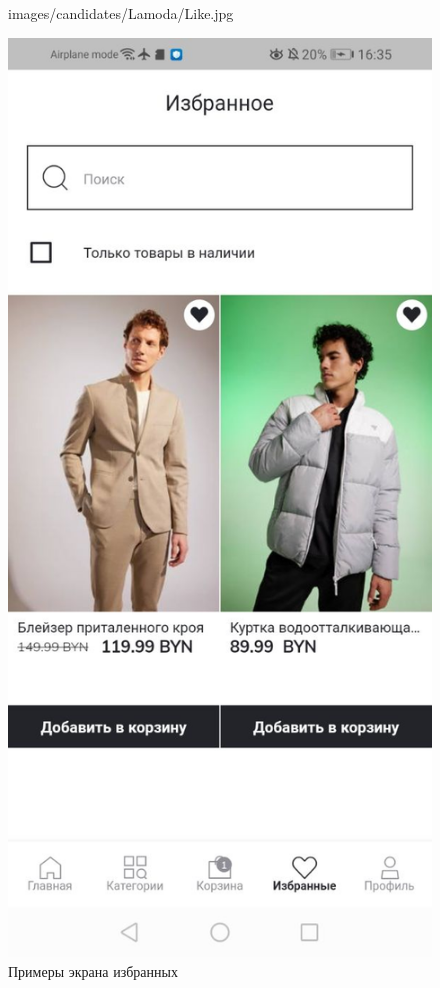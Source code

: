 \begin{figure}[!p]
\begin{minipage}{0.16\textwidth}
    {images/candidates/Lamoda/Like.jpg}
  \end{minipage}
  \begin{minipage}{0.16\textwidth}
    \includegraphics[width=.99\linewidth]
    {images/candidates/DeFacto/Like.jpg}
  \end{minipage}

  \caption{Примеры экрана избранных}\label{fig:analyzLike}
\end{figure}

